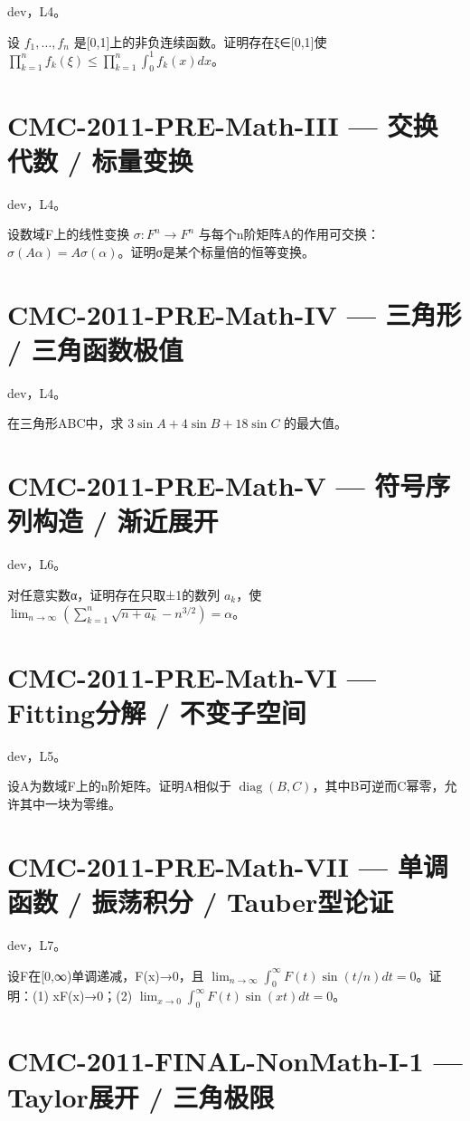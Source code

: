 \documentclass[UTF8]{ctexart}
\begin{document}
dev，L4。

设 $f_1,\ldots,f_n$ 是[0,1]上的非负连续函数。证明存在ξ∈[0,1]使 $\prod_{k=1}^nf_k(\xi)\le\prod_{k=1}^n\int_0^1f_k(x)dx$。

\section*{CMC-2011-PRE-Math-III — 交换代数 / 标量变换}

dev，L4。

设数域F上的线性变换 $\sigma:F^n\to F^n$ 与每个n阶矩阵A的作用可交换：$\sigma(A\alpha)=A\sigma(\alpha)$。证明σ是某个标量倍的恒等变换。

\section*{CMC-2011-PRE-Math-IV — 三角形 / 三角函数极值}

dev，L4。

在三角形ABC中，求 $3\sin A+4\sin B+18\sin C$ 的最大值。

\section*{CMC-2011-PRE-Math-V — 符号序列构造 / 渐近展开}

dev，L6。

对任意实数α，证明存在只取±1的数列 $a_k$，使 $\lim_{n\to\infty}(\sum_{k=1}^n\sqrt{n+a_k}-n^{3/2})=\alpha$。

\section*{CMC-2011-PRE-Math-VI — Fitting分解 / 不变子空间}

dev，L5。

设A为数域F上的n阶矩阵。证明A相似于 $\operatorname{diag}(B,C)$，其中B可逆而C幂零，允许其中一块为零维。

\section*{CMC-2011-PRE-Math-VII — 单调函数 / 振荡积分 / Tauber型论证}

dev，L7。

设F在[0,∞)单调递减，F(x)→0，且 $\lim_{n\to\infty}\int_0^\infty F(t)\sin(t/n)dt=0$。证明：(1) xF(x)→0；(2) $\lim_{x\to0}\int_0^\infty F(t)\sin(xt)dt=0$。

\section*{CMC-2011-FINAL-NonMath-I-1 — Taylor展开 / 三角极限}
\end{document}

